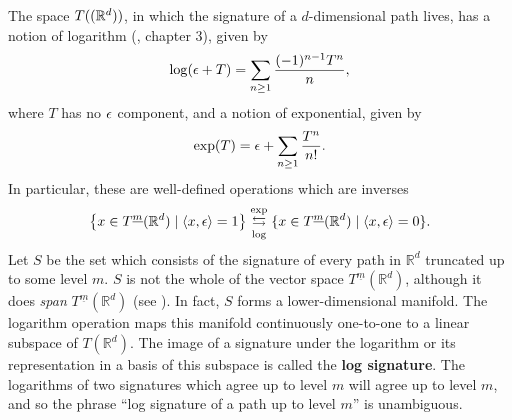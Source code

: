  
The space $T((\mathbb{R}^d))$, in which the signature of a $d$-dimensional path lives, has a notion of logarithm (\cite{FLA}, chapter 3), given by 
\begin{equation}\label{eq:log}
\log(\emptyword+T)=\sum_{n\ge1}\frac{(-1)^{n-1}T^n}{n},\jind{log}
\end{equation}
where $T$ has no $\epsilon$ component, and a notion of exponential, given by 
\begin{equation}\label{eq:expDef}
\exp(T)=\emptyword+\sum_{n\ge1}\frac{T^n}{n!}.\jind{exp}
\end{equation}
In particular, these are well-defined operations which are inverses
\begin{equation}
\big\{x\in T^{\underline m}(\mathbb{R}^d) \mid \langle x,\epsilon\rangle=1\big\}
\underset{\log}{\overset{\exp}{\leftrightarrows}}
\{x\in T^{\underline m}(\mathbb{R}^d) \mid \langle x,\epsilon\rangle=0\}.
\end{equation}
Let $S$ be the set which consists of the signature of every path in $\mathbb{R}^d$ truncated up to some level $m$.
$S$ is not the whole of the vector space  $T^{\underline m}(\mathbb{R}^d)$, although it does \textit{span}  $T^{\underline m}(\mathbb{R}^d)$
(see \cite[Lemma 8]{JD}). In fact, $S$ forms a lower-dimensional manifold. The 
logarithm operation %
maps this manifold continuously one-to-one to a linear subspace of $T(\mathbb{R}^d)$.
The image of a signature under the logarithm or its representation in a basis of this subspace is called the \textbf{log signature}. %
The logarithms of two signatures which agree up to level $m$ will agree up to level $m$, and so the phrase ``log signature of a path up to level $m$'' is unambiguous.

